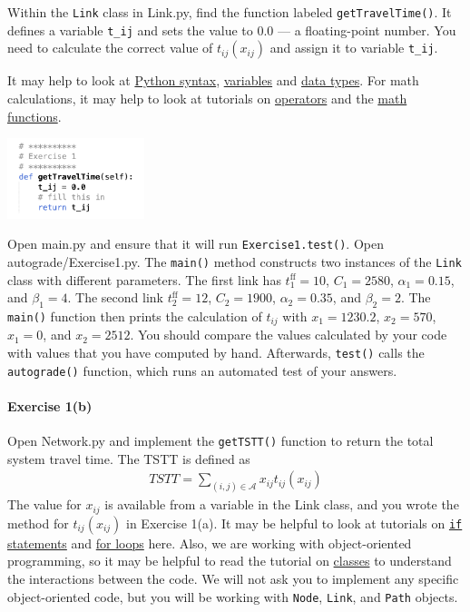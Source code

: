 \documentclass[11pt]{article}
\newcommand{\A}{\mathcal{A}}
\begin{document}
Within the \texttt{Link} class in Link.py, find the function labeled \texttt{getTravelTime()}. It defines a variable \texttt{t\_{ij}} and sets the value to 0.0 --- a floating-point number. You need to calculate the correct value of $t_{ij}(x_{ij})$ and assign it to variable \texttt{t\_ij}. 


It may help to look at  \href{https://www.w3schools.com/python/python_syntax.asp}{Python syntax},  \href{https://www.w3schools.com/python/python_variables.asp}{variables} and \href{https://www.w3schools.com/python/python_datatypes.asp}{data types}. For math calculations, it may help to look at tutorials on \href{https://www.w3schools.com/python/python_operators.asp}{operators} and the \href{https://www.w3schools.com/python/python_math.asp}{math functions}. 

\begin{center}
	\includegraphics[width=0.3\textwidth]{netbeans3.png}
\end{center}

\noindent Open main.py and ensure that it will run \texttt{Exercise1.test()}.
Open autograde/Exercise1.py. The \texttt{main()} method constructs two instances of the \texttt{Link} class with different parameters. The first link has $t^{\mathrm{ff}}_{1}=10$, $C_{1}=2580$, $\alpha_{1}=0.15$, and $\beta_{1}=4$. The second link $t^{\mathrm{ff}}_{2}=12$, $C_{2}=1900$, $\alpha_{2}=0.35$, and $\beta_{2}=2$. The \texttt{main()} function then prints the calculation of $t_{ij}$ with $x_{1}=1230.2$, $x_2=570$, $x_1=0$, and $x_2=2512$. You should compare the values calculated by your code with values that you have computed by hand. 
Afterwards, \texttt{test()} calls the \texttt{autograde()} function, which runs an automated test of your answers. 


	
\paragraph*{Exercise 1(b)}  Open Network.py and implement the \texttt{getTSTT()} function to  return the total system travel time. The TSTT is defined as
\begin{align}
	TSTT = \sum_{(i,j)\in\A} x_{ij} t_{ij}(x_{ij})
\end{align}
The value for $x_{ij}$ is available from a variable in the Link class, and you wrote the method for $t_{ij}(x_{ij})$ in Exercise 1(a).
%
It may be helpful to look at tutorials on \href{https://www.w3schools.com/python/python_conditions.asp}{\texttt{if} statements}
 and \href{https://www.w3schools.com/python/python_for_loops.asp}{for loops} here.  Also, we are working with object-oriented programming, so it may be helpful to read the tutorial on \href{https://www.w3schools.com/python/python_classes.asp}{classes} to understand the interactions between the code. We will not ask you to implement any specific object-oriented code, but you will be working with \texttt{Node}, \texttt{Link}, and \texttt{Path} objects.
\end{document}
